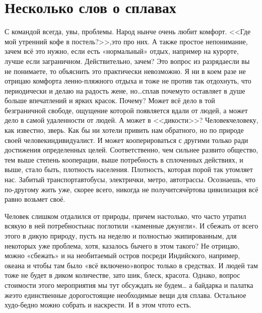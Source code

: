 \chapter{Несколько слов о сплавах} 

С командой всегда, увы, проблемы. Народ нынче очень любит комфорт. <<Где мой утренний кофе в постель?>>,\mdash это про них. А также простое непонимание, зачем всё это нужно, если есть «нормальный» отдых, например на курорте, лучше если заграничном. Действительно, зачем? Это вопрос из разряда\mdash если вы не понимаете, то объяснить это практически невозможно. Я ни в коем разе не отрицаю комфорта ленно-пляжного отдыха и тоже не против так отдохнуть, что периодически и делаю на радость жене, но\ldots сплав почему\sdash то оставляет в душе больше впечатлений и ярких красок. Почему? Может всё дело в той безграничной свободе, ощущение которой появляется вдали от людей, а может дело в самой удаленности от людей. А может в <<дикости>>? Человек\ndash человеку, как известно, зверь. Как бы ни хотели привить нам обратного, но по природе своей человек\mdash индивидуалист. И может кооперироваться с другими только ради достижения определенных целей. Соответственно, чем сильнее развито общество, тем выше степень кооперации, выше потребность в сплоченных действиях, и выше, стало быть, плотность населения. Плотность, которая порой так утомляет нас. Забитый транспорт\mdash автобусы, электрички, метро, автотрассы. Осознаешь, что по-другому жить уже, скорее всего, никогда не получится\mdash чёртова цивилизация всё равно возьмет своё. ­

Человек слишком отдалился от природы, причем настолько, что часто утратил всякую в ней потребность\mdash нас поглотили «каменные джунгли». И сбежать от всего этого в дикую природу, пусть на неделю и полностью экипированным, для некоторых уже проблема, хотя, казалось бы\mdash чего в этом такого? Не отрицаю, можно «сбежать» и на необитаемый остров посреди Индийского, например, океана и чтобы там было «всё включено»\mdash вопрос только в средствах. И людей там тоже не будет в диком количестве, зато шик, блеск, красота. Однако, вопрос стоимости этого мероприятия мы тут обсуждать не будем… а байдарка и палатка же\mdash это единственные дорогостоящие необходимые вещи для сплава. Остальное худо-бедно можно собрать и наскрести. И в этом что\sdash то есть. 

